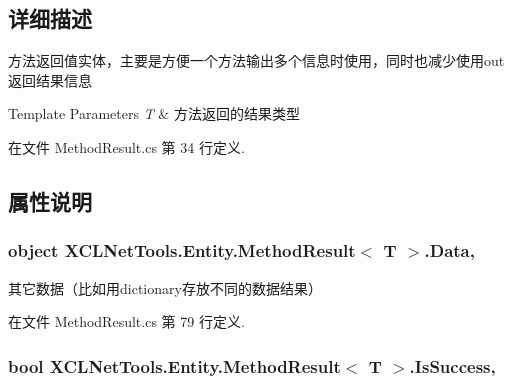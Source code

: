 \subsection{详细描述}
方法返回值实体，主要是方便一个方法输出多个信息时使用，同时也减少使用out返回结果信息 
\begin{DoxyTemplParams}{Template Parameters}
{\em T} & 方法返回的结果类型\\
\hline
\end{DoxyTemplParams}




在文件 Method\-Result.\-cs 第 34 行定义.



\subsection{属性说明}
\hypertarget{class_x_c_l_net_tools_1_1_entity_1_1_method_result_3_01_t_01_4_aa3fcbc6ffc0563dbed708b40c56658d2}{
\subsubsection[{Data}]{\setlength{\rightskip}{0pt plus 5cm}object X\-C\-L\-Net\-Tools.\-Entity.\-Method\-Result$<$ T $>$.Data\hspace{0.3cm}{\ttfamily [get]}, {\ttfamily [set]}}}\label{class_x_c_l_net_tools_1_1_entity_1_1_method_result_3_01_t_01_4_aa3fcbc6ffc0563dbed708b40c56658d2}


其它数据（比如用dictionary存放不同的数据结果） 



在文件 Method\-Result.\-cs 第 79 行定义.

\hypertarget{class_x_c_l_net_tools_1_1_entity_1_1_method_result_3_01_t_01_4_a4add810cc3d83e1bab27f9cf0787376b}{
\subsubsection[{Is\-Success}]{\setlength{\rightskip}{0pt plus 5cm}bool X\-C\-L\-Net\-Tools.\-Entity.\-Method\-Result$<$ T $>$.Is\-Success\hspace{0.3cm}{\ttfamily [get]}, {\ttfamily [set]}}}\label{class_x_c_l_net_tools_1_1_entity_1_1_method_result_3_01_t_01_4_a4add810cc3d83e1bab27f9cf0787376b}


